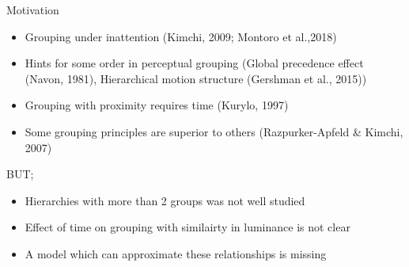 \documentclass[10pt,xcolor=svgnames]{beamer} %
\begin{document}


\begin{frame}{Motivation}
    \begin{itemize}
        \item Grouping under inattention (Kimchi, 2009; Montoro et al.,2018)
        \item Hints for some order in perceptual grouping (Global precedence effect (Navon, 1981), Hierarchical motion structure (Gershman et al., 2015))
        \item Grouping with proximity requires time (Kurylo, 1997)
        \item Some grouping principles are superior to others (Razpurker-Apfeld & Kimchi, 2007)
    \end{itemize}

    BUT;
    \begin{itemize}
        \item Hierarchies with more than 2 groups was not well studied
        \item Effect of time on grouping with similairty in luminance is not clear
        \item A model which can approximate these relationships is missing
    \end{itemize}
\end{frame}
\end{document}
